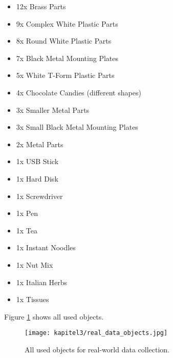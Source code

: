 		\begin{itemize}
			\item 12x Brass Parts
			\item 9x Complex White Plastic Parts
			\item 8x Round White Plastic Parts
			\item 7x Black Metal Mounting Plates
			\item 5x White T-Form Plastic Parts
			\item 4x Chocolate Candies (different shapes)
			\item 3x Smaller Metal Parts
			\item 3x Small Black Metal Mounting Plates
			\item 2x Metal Parts
			\item 1x USB Stick
			\item 1x Hard Disk
			\item 1x Screwdriver
			\item 1x Pen
			\item 1x Tea
			\item 1x Instant Noodles
			\item 1x Nut Mix
			\item 1x Italian Herbs
			\item 1x Tissues
		\end{itemize}
		Figure \ref{img:real-data-objects} shows all used objects.
		\begin{figure}[h]
			\centering
			\texttt{[image: kapitel3/real\_data\_objects.jpg]}
			\caption[All used objects for real-world data collection.]{All used objects for real-world data collection.}
			\label{img:real-data-objects}
		\end{figure}
		
